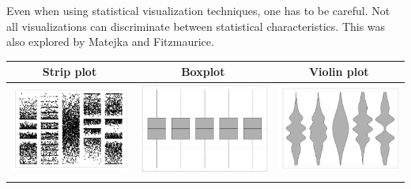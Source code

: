 \documentclass[
  letterpaper,
]{scrbook}
\begin{document}
Even when using statistical visualization techniques, one has to be careful. Not all visualizations can discriminate between statistical characteristics. This was also explored by Matejka and Fitzmaurice.

\begin{longtable}[]{@{}ccc@{}}
\toprule
Strip plot & Boxplot & Violin plot\tabularnewline
\midrule
\endhead
\includegraphics{graphs/box1.png} & \includegraphics{graphs/box2.png} & \includegraphics{graphs/box3.png}\tabularnewline
\bottomrule
\end{longtable}
\end{document}
